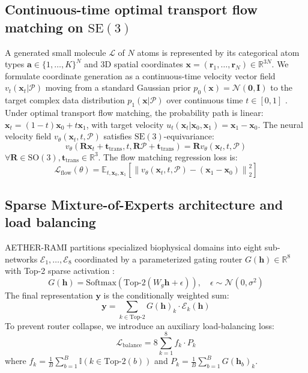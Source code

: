 \documentclass[11pt,a4paper]{article}
\begin{document}
\subsection*{Continuous-time optimal transport flow matching on $\mathrm{SE}(3)$}
A generated small molecule $\mathcal{L}$ of $N$ atoms is represented by its categorical atom types $\mathbf{a} \in \{1, \dots, K\}^N$ and 3D spatial coordinates $\mathbf{x} = (\mathbf{r}_1, \dots, \mathbf{r}_N) \in \mathbb{R}^{3N}$. We formulate coordinate generation as a continuous-time velocity vector field $v_t(\mathbf{x}_t | \mathcal{P})$ moving from a standard Gaussian prior $p_0(\mathbf{x}) = \mathcal{N}(\mathbf{0}, \mathbf{I})$ to the target complex data distribution $p_1(\mathbf{x} | \mathcal{P})$ over continuous time $t \in [0, 1]$ \cite{lipman2023flow,albergo2023building}. Under optimal transport flow matching, the probability path is linear: $\mathbf{x}_t = (1 - t)\mathbf{x}_0 + t\mathbf{x}_1$, with target velocity $u_t(\mathbf{x}_t | \mathbf{x}_0, \mathbf{x}_1) = \mathbf{x}_1 - \mathbf{x}_0$. The neural velocity field $v_\theta(\mathbf{x}_t, t, \mathcal{P})$ satisfies $\mathrm{SE}(3)$-equivariance:
\begin{equation}
v_\theta(\mathbf{R}\mathbf{x}_t + \mathbf{t}_{\text{trans}}, t, \mathbf{R}\mathcal{P} + \mathbf{t}_{\text{trans}}) = \mathbf{R} v_\theta(\mathbf{x}_t, t, \mathcal{P})
\end{equation}
$\forall \mathbf{R} \in \mathrm{SO}(3), \mathbf{t}_{\text{trans}} \in \mathbb{R}^3$. The flow matching regression loss is:
\begin{equation}
\mathcal{L}_{\text{flow}}(\theta) = \mathbb{E}_{t, \mathbf{x}_0, \mathbf{x}_1} \left[ \left\| v_\theta(\mathbf{x}_t, t, \mathcal{P}) - (\mathbf{x}_1 - \mathbf{x}_0) \right\|_2^2 \right]
\end{equation}

\subsection*{Sparse Mixture-of-Experts architecture and load balancing}
AETHER-RAMI partitions specialized biophysical domains into eight sub-networks $\mathcal{E}_1, \dots, \mathcal{E}_8$ coordinated by a parameterized gating router $G(\mathbf{h}) \in \mathbb{R}^8$ with Top-2 sparse activation \cite{shazeer2017outrageously}:
\begin{equation}
G(\mathbf{h}) = \text{Softmax}\left( \text{Top-2}\left( W_g \mathbf{h} + \epsilon \right) \right), \quad \epsilon \sim \mathcal{N}(0, \sigma^2)
\end{equation}
The final representation $\mathbf{y}$ is the conditionally weighted sum:
\begin{equation}
\mathbf{y} = \sum_{k \in \text{Top-2}} G(\mathbf{h})_k \cdot \mathcal{E}_k(\mathbf{h})
\end{equation}
To prevent router collapse, we introduce an auxiliary load-balancing loss:
\begin{equation}
\mathcal{L}_{\text{balance}} = 8 \sum_{k=1}^8 f_k \cdot P_k
\end{equation}
where $f_k = \frac{1}{B} \sum_{b=1}^B \mathbb{I}(k \in \text{Top-2}(b))$ and $P_k = \frac{1}{B} \sum_{b=1}^B G(\mathbf{h}_b)_k$.
\end{document}
